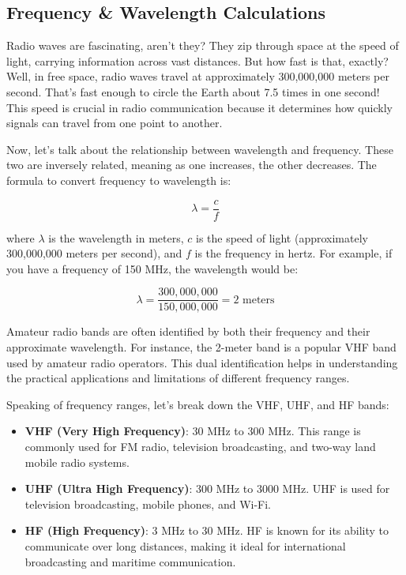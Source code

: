\subsection{Frequency \& Wavelength Calculations}
\label{subsec:freq-wavelength}

Radio waves are fascinating, aren't they? They zip through space at the speed of light, carrying information across vast distances. But how fast is that, exactly? Well, in free space, radio waves travel at approximately 300,000,000 meters per second. That's fast enough to circle the Earth about 7.5 times in one second! This speed is crucial in radio communication because it determines how quickly signals can travel from one point to another.

Now, let's talk about the relationship between wavelength and frequency. These two are inversely related, meaning as one increases, the other decreases. The formula to convert frequency to wavelength is:

\begin{equation}
\lambda = \frac{c}{f}
\label{eq:wavelength}
\end{equation}

where \(\lambda\) is the wavelength in meters, \(c\) is the speed of light (approximately 300,000,000 meters per second), and \(f\) is the frequency in hertz. For example, if you have a frequency of 150 MHz, the wavelength would be:

\[
\lambda = \frac{300,000,000}{150,000,000} = 2 \text{ meters}
\]

Amateur radio bands are often identified by both their frequency and their approximate wavelength. For instance, the 2-meter band is a popular VHF band used by amateur radio operators. This dual identification helps in understanding the practical applications and limitations of different frequency ranges.

Speaking of frequency ranges, let's break down the VHF, UHF, and HF bands:

\begin{itemize}
    \item \textbf{VHF (Very High Frequency)}: 30 MHz to 300 MHz. This range is commonly used for FM radio, television broadcasting, and two-way land mobile radio systems.
    \item \textbf{UHF (Ultra High Frequency)}: 300 MHz to 3000 MHz. UHF is used for television broadcasting, mobile phones, and Wi-Fi.
    \item \textbf{HF (High Frequency)}: 3 MHz to 30 MHz. HF is known for its ability to communicate over long distances, making it ideal for international broadcasting and maritime communication.
\end{itemize}

